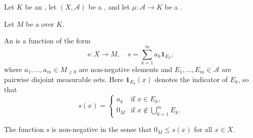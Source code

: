 \begin{definition} \label{definition:sigma_complete_lattice_ordered_semimodule_valued_simple_function_on_a_measure_space_on_a_measurable_space_with_values_in_an_ordered_semiring}
Let $K$ be an , let $(X,\mathcal{A})$ be a , and let $\mu : \mathcal{A} \to K$ be a .

Let $M$ be a  over $K$.

An  is a function of the form
$$s : X \to M, \quad s = \sum_{k=1}^m a_k \mathbf{1}_{E_k},$$
where $a_1, \ldots, a_m \in M_{\geq 0}$ are non-negative elements and $E_1, \ldots, E_m \in \mathcal{A}$ are pairwise disjoint measurable sets. Here $\mathbf{1}_{E_k}(x)$ denotes the indicator of $E_k$, so that
$$s(x) = \begin{cases} a_k & \text{if } x \in E_k, \\ 0_M & \text{if } x \notin \bigcup_{k=1}^m E_k. \end{cases}$$

The function $s$ is non-negative in the sense that $0_M \leq s(x)$ for all $x \in X$.
\end{definition}
